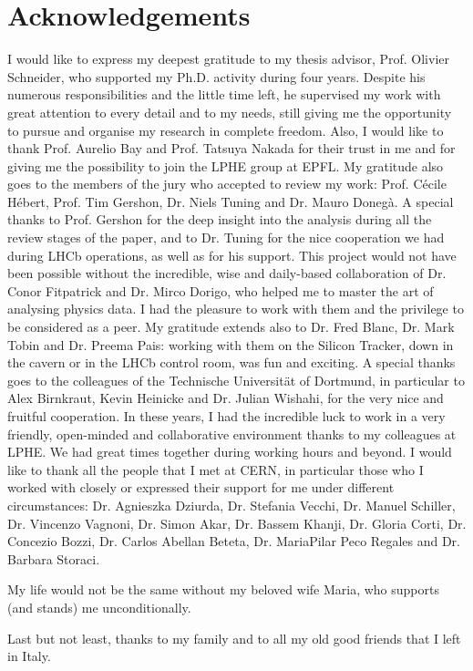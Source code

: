 \chapter*{Acknowledgements}
\vskip0.2cm
I would like to express my deepest gratitude to my thesis advisor, Prof. Olivier Schneider, 
who supported my Ph.D. activity during four years. Despite his numerous
responsibilities and the little time left, he supervised my work with 
great attention to every detail and to my needs, still giving me the
opportunity to pursue and organise my research in complete freedom.
Also, I would like to thank
Prof. Aurelio Bay and Prof. Tatsuya Nakada for their trust in me
and for giving me the possibility to join the LPHE group at EPFL.
My gratitude also goes to the members of the jury who accepted to review my
work: Prof. C\'ecile H\'ebert, Prof. Tim Gershon, Dr. Niels Tuning and Dr. Mauro Doneg\`a.
A special thanks to Prof. Gershon for the deep insight into the analysis during all the review stages of the paper,
and to Dr. Tuning for the nice cooperation we had during LHCb operations, as well as for his support.   
This project would not have been possible without the incredible, wise and daily-based collaboration 
of Dr. Conor Fitpatrick and Dr. Mirco Dorigo, who helped me to master the art of analysing physics data. 
I had the pleasure to work with them and the privilege to be considered as a peer.
My gratitude extends also to Dr. Fred Blanc, Dr. Mark Tobin and Dr. Preema Pais:
working with them on the Silicon Tracker, down in the cavern or in the LHCb control room, was
fun and exciting.
A special thanks goes to the colleagues of the Technische Universit\"at of Dortmund, in particular to
Alex Birnkraut, Kevin Heinicke and Dr. Julian Wishahi, for the very nice and fruitful
cooperation. 
In these years, I had the incredible luck to work in a very friendly, open-minded and
collaborative environment thanks to my colleagues at LPHE. We had great times
together during working hours and beyond.
I would like to thank all the people that I met at CERN, in particular those who
I worked with closely or expressed their support for me under different circumstances:
Dr. Agnieszka Dziurda, Dr. Stefania Vecchi, Dr. Manuel Schiller, Dr. Vincenzo Vagnoni, Dr. Simon Akar, Dr. Bassem Khanji, Dr. Gloria Corti,
Dr. Concezio Bozzi, Dr. Carlos Abellan Beteta, Dr. MariaPilar Peco Regales and Dr. Barbara Storaci.  

My life would not be the same without my beloved wife Maria, who supports (and stands) me unconditionally. 

Last but not least, thanks to my family and to all my old good friends that I left in Italy. \\
